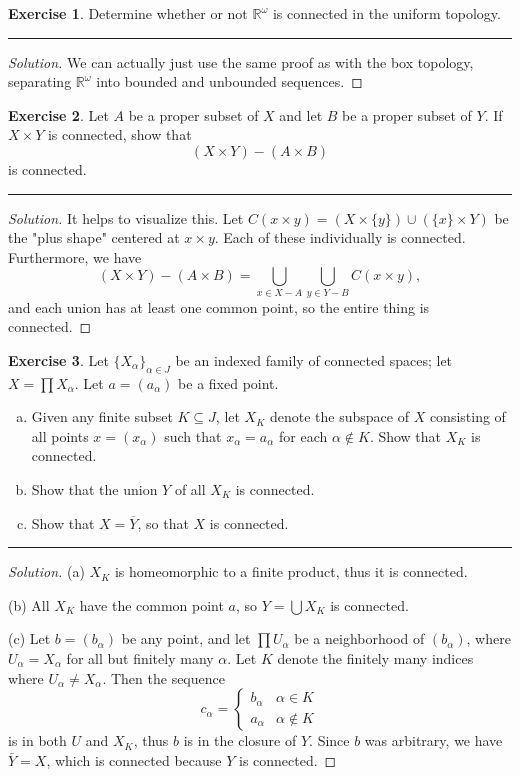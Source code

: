 \documentclass{article}
\theoremstyle{definition}
\newtheorem{exercise}{Exercise}[section]
\begin{document}
\begin{exercise}
  Determine whether or not $\mathbb{R}^\omega$ is connected in the uniform topology.
\end{exercise}
\hrule
\begin{proof}[Solution]
  We can actually just use the same proof as with the box topology, separating $\mathbb{R}^\omega$ into bounded and unbounded sequences.
\end{proof}

\pagebreak

\begin{exercise}
  Let $A$ be a proper subset of $X$ and let $B$ be a proper subset of $Y$. If $X\times Y$ is connected, show that
  $$(X\times Y) - (A\times B)$$
  is connected.
\end{exercise}
\hrule
\begin{proof}[Solution]
  It helps to visualize this. Let $C(x\times y) = (X\times\{y\})\cup(\{x\}\times Y)$ be the "plus shape" centered at $x\times y$. Each of these individually is connected. Furthermore, we have
  $$(X \times Y) - (A\times B) = \bigcup_{x\in X-A}\bigcup_{y\in Y-B}C(x\times y),$$
  and each union has at least one common point, so the entire thing is connected.
\end{proof}

\pagebreak

\begin{exercise}
  Let $\{X_\alpha\}_{\alpha\in J}$ be an indexed family of connected spaces; let $X = \prod X_\alpha$. Let $a = (a_\alpha)$ be a fixed point.
  \begin{enumerate}[(a)]
    \item Given any finite subset $K\subseteq J$, let $X_K$ denote the subspace of $X$ consisting of all points $x = (x_\alpha)$ such that $x_\alpha = a_\alpha$ for each $\alpha\notin K$. Show that $X_K$ is connected.
    \item Show that the union $Y$ of all $X_K$ is connected.
    \item Show that $X = \overline{Y}$, so that $X$ is connected.
  \end{enumerate}
\end{exercise}
\hrule
\begin{proof}[Solution]
  (a) $X_K$ is homeomorphic to a finite product, thus it is connected.
  
  (b) All $X_K$ have the common point $a$, so $Y = \bigcup X_K$ is connected.

  (c) Let $b = (b_\alpha)$ be any point, and let $\prod U_\alpha$ be a neighborhood of $(b_\alpha)$, where $U_\alpha = X_\alpha$ for all but finitely many $\alpha$.
  Let $K$ denote the finitely many indices where $U_\alpha\ne X_\alpha$. Then the sequence
  $$c_\alpha = \begin{cases}
    b_\alpha & \alpha\in K \\
    a_\alpha & \alpha\notin K
  \end{cases}$$
  is in both $U$ and $X_K$, thus $b$ is in the closure of $Y$. Since $b$ was arbitrary, we have $\bar{Y} = X$, which is connected because $Y$ is connected.
\end{proof}
\end{document}
